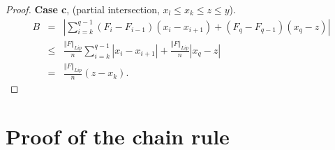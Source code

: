 \documentclass[final,12pt]{colt2018} %
\begin{document}
\begin{proof}
							\textbf{Case c}, (partial intersection, $x_{l}\leq x_{k}\leq z\leq y$). 
							\begin{eqnarray*}
								B &=&\left\vert \sum_{i=k}^{q-1}\left( F_{i}-F_{i-1}\right) \left(
								x_{i}-x_{i+1}\right) +\left( F_{q}-F_{q-1}\right) \left( x_{q}-z\right)
								\right\vert  \\
								&\leq &\frac{\left\Vert F\right\Vert _{Lip}}{n}\sum_{i=k}^{q-1}\left\vert
								x_{i}-x_{i+1}\right\vert +\frac{\left\Vert F\right\Vert _{Lip}}{n}\left\vert
								x_{q}-z\right\vert  \\
								&=&\frac{\left\Vert F\right\Vert _{Lip}}{n}\left( z-x_{k}\right) .
							\end{eqnarray*}
						\end{proof}
						
						
						\section{Proof of the chain rule\label{Subsection Proof Chainrule}}
						
\end{document}
